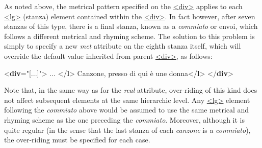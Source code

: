 As noted above, the metrical pattern specified on the \hyperref[TEI.div]{<div>} applies to each \hyperref[TEI.lg]{<lg>} (stanza) element contained within the \hyperref[TEI.div]{<div>}. In fact however, after seven stanzas of this type, there is a final stanza, known as a \textit{commiato} or envoi, which follows a different metrical and rhyming scheme. The solution to this problem is simply to specify a new {\itshape met} attribute on the eighth stanza itself, which will override the default value inherited from parent \hyperref[TEI.div]{<div>}, as follows: \par\bgroup{}\exampleFont \begin{shaded}\noindent\mbox{}{<\textbf{div}\hspace*{1em}{met}="{[...]}">}\mbox{}\newline 
{}\mbox{}\newline 
\hspace*{1em} ... {</\textbf{l}>}\mbox{}\newline 
{}\mbox{}\newline 
{}\mbox{}\newline 
\hspace*{1em}Canzone, presso di qui è une donna{</\textbf{l}>}\mbox{}\newline 
{}\mbox{}\newline 
{</\textbf{div}>}\end{shaded}\egroup\par \par
Note that, in the same way as for the {\itshape real} attribute, over-riding of this kind does not affect subsequent elements at the same hierarchic level. Any \hyperref[TEI.lg]{<lg>} element following the \textit{commiato} above would be assumed to use the same metrical and rhyming scheme as the one preceding the \textit{commiato}. Moreover, although it is quite regular (in the sense that the last stanza of each \textit{canzone} is a \textit{commiato}), the over-riding must be specified for each case.
